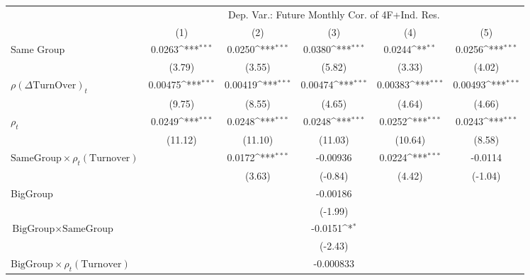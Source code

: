 {
\def\sym#1{\ifmmode^{#1}\else\(^{#1}\)\fi}
\begin{tabular}{l*{5}{c}}
\hline\hline
                &\multicolumn{5}{c}{Dep. Var.: Future Monthly Cor.  of 4F+Ind. Res.}                           \\\cmidrule(lr){2-6}
                &\multicolumn{1}{c}{(1)}         &\multicolumn{1}{c}{(2)}         &\multicolumn{1}{c}{(3)}         &\multicolumn{1}{c}{(4)}         &\multicolumn{1}{c}{(5)}         \\
\hline
Same Group      &   0.0263\sym{***}&   0.0250\sym{***}&   0.0380\sym{***}&   0.0244\sym{**} &   0.0256\sym{***}\\
                &   (3.79)         &   (3.55)         &   (5.82)         &   (3.33)         &   (4.02)         \\
[1em]
 $ {\rho(\Delta \text{TurnOver})_t} $ &  0.00475\sym{***}&  0.00419\sym{***}&  0.00474\sym{***}&  0.00383\sym{***}&  0.00493\sym{***}\\
                &   (9.75)         &   (8.55)         &   (4.65)         &   (4.64)         &   (4.66)         \\
[1em]
 $ {\rho_t} $   &   0.0249\sym{***}&   0.0248\sym{***}&   0.0248\sym{***}&   0.0252\sym{***}&   0.0243\sym{***}\\
                &  (11.12)         &  (11.10)         &  (11.03)         &  (10.64)         &   (8.58)         \\
[1em]
$ {\text{SameGroup} \times  {\rho_t(\text{Turnover})} } $ &                  &   0.0172\sym{***}& -0.00936         &   0.0224\sym{***}&  -0.0114         \\
                &                  &   (3.63)         &  (-0.84)         &   (4.42)         &  (-1.04)         \\
[1em]
BigGroup        &                  &                  & -0.00186         &                  &                  \\
                &                  &                  &  (-1.99)         &                  &                  \\
[1em]
$ {\text{BigGroup} } \times {\text{SameGroup} }  $ &                  &                  &  -0.0151\sym{*}  &                  &                  \\
                &                  &                  &  (-2.43)         &                  &                  \\
[1em]
$ {\text{BigGroup} } \times  {\rho_t(\text{Turnover})}  $ &                  &                  &-0.000833         &                  &                  \\

\end{tabular}}
